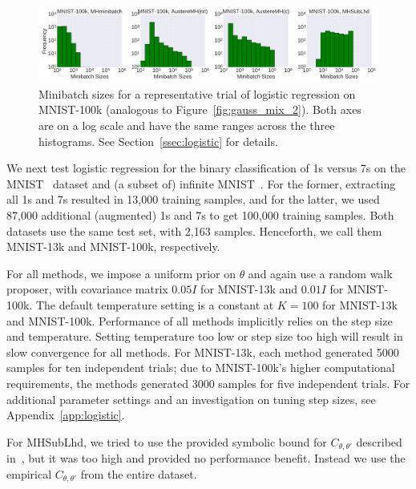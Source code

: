 \documentclass[letterpaper]{article}
\begin{document}
\begin{figure}[t]
	\centering
    \includegraphics[width=0.9\linewidth]{logistic_regression_histograms_mnist8m.png}
	\caption{
    Minibatch sizes for a representative trial of logistic regression on
    MNIST-100k (analogous to Figure~\ref{fig:gauss_mix_2}). Both axes are on a
    log scale and have the same ranges across the three histograms.  See
    Section~\ref{ssec:logistic} for details.
    }
	\label{fig:logistic_histograms_mnist8m}
\end{figure}

We next test logistic regression for the binary classification of 1s versus 7s
on the MNIST~\citep{lecun-mnisthandwrittendigit-2010} dataset and (a subset of)
infinite MNIST~\citep{loosli-canu-bottou-2006}. For the former, extracting all 1s
and 7s resulted in 13,000 training samples, and for the latter, we used 87,000
additional (augmented) 1s and 7s to get 100,000 training samples. Both datasets
use the same test set, with 2,163 samples. Henceforth, we call them MNIST-13k
and MNIST-100k, respectively.

For all methods, we impose a uniform prior on $\theta$ and again use a random
walk proposer, with covariance matrix $0.05I$ for MNIST-13k and $0.01I$ for
MNIST-100k. The default temperature setting is a constant at $K=100$ for
MNIST-13k and MNIST-100k. Performance of all methods implicitly relies on the
step size and temperature. Setting temperature too low or step size too high
will result in slow convergence for all methods. For MNIST-13k, each method
generated 5000 samples for ten independent trials; due to MNIST-100k's higher
computational requirements, the methods generated 3000 samples for five
independent trials.  For additional parameter settings and an investigation on
tuning step sizes, see Appendix~\ref{app:logistic}.

For {\sc MHSubLhd}, we tried to use the provided symbolic bound for
$C_{\theta,\theta'}$ described in~\citep{icml2014c1_bardenet14}, but it was too
high and provided no performance benefit. Instead we use the empirical
$C_{\theta,\theta'}$ from the entire dataset. 
\end{document}
